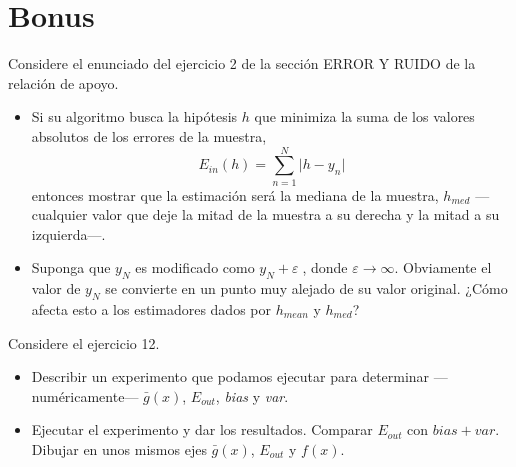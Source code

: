 \documentclass[a4paper, 11pt]{article}
\begin{document}
    \section{Bonus}

    \begin{bonus}
        Considere el enunciado del ejercicio 2 de la sección ERROR Y RUIDO de la relación de apoyo.
        \begin{itemize}
            \item Si su algoritmo busca la hipótesis $h$ que minimiza la suma de los valores absolutos de los errores de la muestra,
            \[
            E_{in}(h) = \sum_{n=1}^N \vert h - y_n \vert
            \]
            entonces mostrar que la estimación será la mediana de la muestra, $h_{med}$ ---cualquier valor que deje la mitad de la muestra a su derecha y la mitad a su izquierda---.
            \item Suponga que $y_N$ es modificado como $y_N + \varepsilon$, donde $\varepsilon \to \infty$. Obviamente el valor de $y_N$ se convierte en un punto muy alejado de su valor original. ¿Cómo afecta esto a los estimadores dados por $h_{mean}$ y $h_{med}$?
        \end{itemize}
    \end{bonus}



    \begin{bonus}
        Considere el ejercicio 12.
        \begin{itemize}
            \item Describir un experimento que podamos ejecutar para determinar ---numéricamente--- $\bar{g}(x)$, $E_{out}$, \emph{bias} y \emph{var}.
            \item Ejecutar el experimento y dar los resultados. Comparar $E_{out}$ con $bias+var$. Dibujar en unos mismos ejes $\bar{g}(x)$, $E_{out}$ y $f(x)$.
        \end{itemize}
    \end{bonus}
\end{document}
